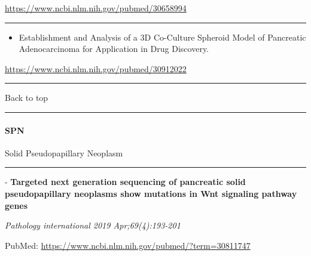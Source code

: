 \documentclass[]{article}
\providecommand{\tightlist}{%
  \setlength{\itemsep}{0pt}\setlength{\parskip}{0pt}}
\let\oldparagraph\paragraph
\renewcommand{\paragraph}[1]{\oldparagraph{#1}\mbox{}}
\begin{document}
\url{https://www.ncbi.nlm.nih.gov/pubmed/30658994}

\begin{center}\rule{0.5\linewidth}{\linethickness}\end{center}

\begin{itemize}
\tightlist
\item
  Establishment and Analysis of a 3D Co-Culture Spheroid Model of
  Pancreatic Adenocarcinoma for Application in Drug Discovery.
\end{itemize}

\url{https://www.ncbi.nlm.nih.gov/pubmed/30912022}

\begin{center}\rule{0.5\linewidth}{\linethickness}\end{center}

Back to top

\begin{center}\rule{0.5\linewidth}{\linethickness}\end{center}

\pagebreak

\hypertarget{spn-1}{%
\paragraph{SPN}\label{spn-1}}

Solid Pseudopapillary Neoplasm

\begin{center}\rule{0.5\linewidth}{\linethickness}\end{center}

 - \textbf{Targeted next generation sequencing of pancreatic solid
pseudopapillary neoplasms show mutations in Wnt signaling pathway genes}

\emph{Pathology international 2019 Apr;69(4):193-201}

PubMed: \url{https://www.ncbi.nlm.nih.gov/pubmed/?term=30811747}
\end{document}
